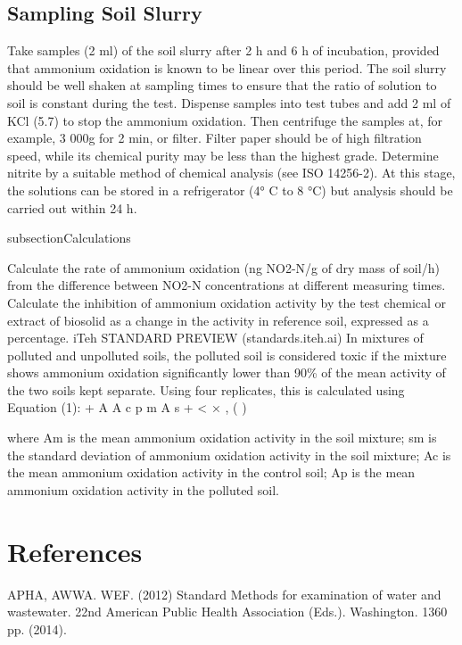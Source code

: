 \documentclass[12pt]{SOP5_beta}\usepackage[]{graphicx}\usepackage[]{xcolor}
\begin{document}
\subsection{Sampling Soil Slurry}

\NP Take samples (2 ml) of the soil slurry after 2 h and 6 h of incubation, provided that ammonium oxidation is known to be linear over this period. The soil slurry should be well shaken at sampling times to ensure that the ratio of solution to soil is constant during the test. Dispense samples into test tubes and add 2 ml of KCl (5.7) to stop the ammonium oxidation. Then centrifuge the samples at, for example, 3 000g for 2 min, or filter. Filter paper should be of high filtration speed, while its chemical purity may be less than the highest grade. Determine nitrite by a suitable method of chemical analysis (see ISO 14256-2). At this stage, the solutions can be stored in a refrigerator (4° C to 8 °C) but analysis should be carried out within 24 h. 


subsection{Calculations}

\NP Calculate the rate of ammonium oxidation (ng NO2-N/g of dry mass of soil/h) from the difference between NO2-N concentrations at different measuring times. Calculate the inhibition of ammonium oxidation activity by the test chemical or extract of biosolid as a change in the activity in reference soil, expressed as a percentage. iTeh STANDARD PREVIEW (standards.iteh.ai) In mixtures of polluted and unpolluted soils, the polluted soil is considered toxic if the mixture shows ammonium oxidation significantly lower than 90\% of the mean activity of the two soils kept separate. Using four replicates, this is calculated using Equation (1): + A A c p m A s + < × , ( ) 


where Am is the mean ammonium oxidation activity in the soil mixture; sm is the standard deviation of ammonium oxidation activity in the soil mixture; Ac is the mean ammonium oxidation activity in the control soil; Ap is the mean ammonium oxidation activity in the polluted soil.



\section{References}

\NP APHA, AWWA. WEF. (2012) Standard Methods for examination of water and wastewater. 22nd American Public Health Association (Eds.). Washington. 1360 pp. (2014).
\end{document}
